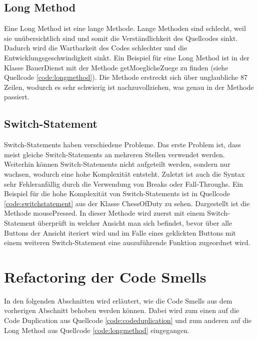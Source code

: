 \subsection{Long Method}
Eine Long Method ist eine lange Methode. Lange Methoden sind schlecht, weil sie unübersichtlich sind und somit die Verständlichkeit des Quellcodes sinkt. Dadurch wird die Wartbarkeit des Codes schlechter und die Entwicklungsgeschwindigkeit sinkt. Ein Beispiel für eine Long Method ist in der Klasse BauerDienst mit der Methode getMoeglicheZuege zu finden (siehe Quellcode \ref{code:longmethod}). Die Methode erstreckt sich über unglaubliche 87 Zeilen, wodurch es sehr schwierig ist nachzuvollziehen, was genau in der Methode passiert.



\subsection{Switch-Statement}
Switch-Statements haben verschiedene Probleme.
Das erste Problem ist, dass meist gleiche Switch-Statements an mehreren Stellen verwendet werden. Weiterhin können Switch-Statements nicht aufgeteilt werden, sondern nur wachsen, wodurch eine hohe Komplexität entsteht. Zuletzt ist auch die Syntax sehr Fehleranfällig durch die Verwendung von Breaks oder Fall-Throughs. Ein Beispiel für die hohe Komplexität von Switch-Statements ist in Quellcode \ref{code:switchstatement} aus der Klasse ChessOfDuty zu sehen. Dargestellt ist die Methode mousePressed. In dieser Methode wird zuerst mit einem Switch-Statement überprüft in welcher Ansicht man sich befindet, bevor über alle Buttons der Ansicht iteriert wird und im Falle eines geklickten Buttons mit einem weiteren Switch-Statement eine auszuführende Funktion zugeordnet wird.



\section{Refactoring der Code Smells}
In den folgenden Abschnitten wird erläutert, wie die Code Smells aus dem vorherigen Abschnitt behoben werden können. Dabei wird zum einen auf die Code Duplication aus Quellcode \ref{code:codeduplication} und zum anderen auf die Long Method aus Quellcode \ref{code:longmethod} eingegangen.


